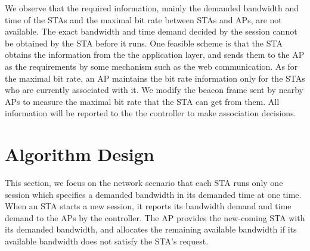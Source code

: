 \documentclass[conference]{IEEEtran}
\begin{document}
  We observe that the required information, mainly the demanded bandwidth and time of the STAs and the maximal bit rate between STAs and APs, are not available.  The exact bandwidth and time demand decided by the session cannot be obtained by the STA before it runs.  One feasible scheme is that the STA obtains the information from the the application layer, and sends them to the AP as the requirements by some mechanism such as the web communication.  As for the maximal bit rate, an AP maintains the bit rate information only for the STAs who are currently associated with it.  We modify the beacon frame sent by nearby APs to measure the maximal bit rate that the STA can get from them.  All information will be reported to the the controller to make association decisions.

  \section{Algorithm Design}\label{sec:algorithm}
  This section, we focus on the network scenario that each STA runs only one session which specifies a demanded bandwidth in its demanded time at one time.  When an STA starts a new session, it reports its bandwidth demand and time demand to the APs by the controller.  The AP provides the new-coming STA with its demanded bandwidth, and allocates the remaining available bandwidth if its available bandwidth does not satisfy the STA's request.
\end{document}
